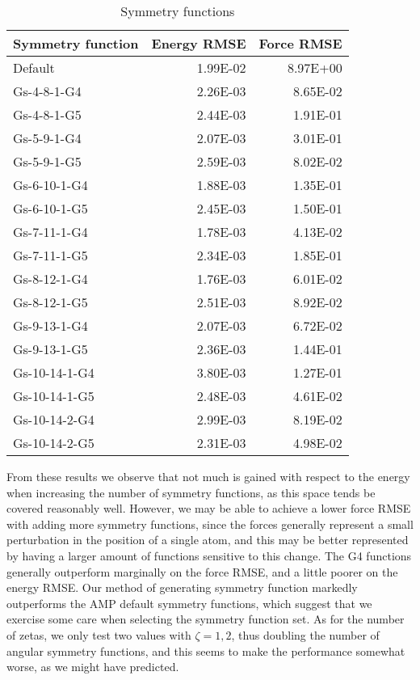 \begin{table}[H]
\centering
\begin{tabular}{lrr}
\toprule
Symmetry function &  Energy RMSE &  Force RMSE \\
\midrule
          Default &     1.99E-02 &    8.97E+00 \\
      Gs-4-8-1-G4 &     2.26E-03 &    8.65E-02 \\
      Gs-4-8-1-G5 &     2.44E-03 &    1.91E-01 \\
      Gs-5-9-1-G4 &     2.07E-03 &    3.01E-01 \\
      Gs-5-9-1-G5 &     2.59E-03 &    8.02E-02 \\
     Gs-6-10-1-G4 &     1.88E-03 &    1.35E-01 \\
     Gs-6-10-1-G5 &     2.45E-03 &    1.50E-01 \\
     Gs-7-11-1-G4 &     1.78E-03 &    4.13E-02 \\
     Gs-7-11-1-G5 &     2.34E-03 &    1.85E-01 \\
     Gs-8-12-1-G4 &     1.76E-03 &    6.01E-02 \\
     Gs-8-12-1-G5 &     2.51E-03 &    8.92E-02 \\
     Gs-9-13-1-G4 &     2.07E-03 &    6.72E-02 \\
     Gs-9-13-1-G5 &     2.36E-03 &    1.44E-01 \\
    Gs-10-14-1-G4 &     3.80E-03 &    1.27E-01 \\
    Gs-10-14-1-G5 &     2.48E-03 &    4.61E-02 \\
    Gs-10-14-2-G4 &     2.99E-03 &    8.19E-02 \\
    Gs-10-14-2-G5 &     2.31E-03 &    4.98E-02 \\
\bottomrule
\end{tabular}
\caption{Symmetry functions}
\label{table:symmetry}
\end{table}

From these results we observe that not much is gained with respect
to the energy when increasing the number of symmetry functions,
as this space tends be covered reasonably well.
However, we may be able to achieve a lower force RMSE
with adding more symmetry functions, since the forces generally
represent a small perturbation in the position of a single atom,
and this may be better represented by having a larger amount
of functions sensitive to this change. The G4 functions generally
outperform marginally on the force RMSE, and a little poorer
on the energy RMSE.
Our method of generating symmetry function markedly outperforms
the AMP default symmetry functions, which suggest that we exercise
some care when selecting the symmetry function set.
As for the number of zetas, we only test two values with
$\zeta = 1, 2$, thus doubling the number of angular symmetry functions,
and this seems to make the performance somewhat worse, as we 
might have predicted.


